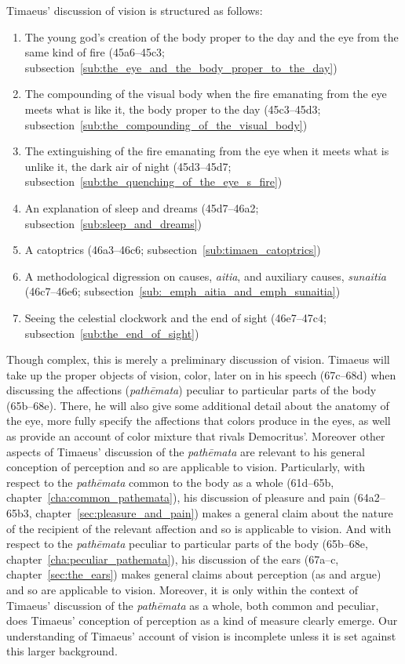 Timaeus' discussion of vision is structured as follows:
\begin{enumerate}
	\item The young god's creation of the body proper to the day and the eye from the same kind of fire (45a6--45c3; subsection~\ref{sub:the_eye_and_the_body_proper_to_the_day})
	\item The compounding of the visual body when the fire emanating from the eye meets what is like it, the body proper to the day (45c3--45d3; subsection~\ref{sub:the_compounding_of_the_visual_body})
	\item The extinguishing of the fire emanating from the eye when it meets what is unlike it, the dark air of night (45d3--45d7; subsection~\ref{sub:the_quenching_of_the_eye_s_fire})
	\item An explanation of sleep and dreams (45d7--46a2; subsection~\ref{sub:sleep_and_dreams})
	\item A catoptrics (46a3--46c6; subsection~\ref{sub:timaen_catoptrics})
	\item A methodological digression on causes, \emph{aitia}, and auxiliary causes, \emph{sunaitia} (46c7--46e6; subsection~\ref{sub:_emph_aitia_and_emph_sunaitia})
	\item Seeing the celestial clockwork and the end of sight (46e7--47c4; subsection~\ref{sub:the_end_of_sight})
\end{enumerate}
Though complex, this is merely a preliminary discussion of vision. Timaeus will take up the proper objects of vision, color, later on in his speech (67c–68d) when discussing the affections (\emph{pathēmata}) peculiar to particular parts of the body (65b–68e). There, he will also give some additional detail about the anatomy of the eye, more fully specify the affections that colors produce in the eyes, as well as provide an account of color mixture that rivals Democritus'. Moreover other aspects of Timaeus' discussion of the \emph{pathēmata} are relevant to his general conception of perception and so are applicable to vision. Particularly, with respect to the \emph{pathēmata} common to the body as a whole (61d–65b, chapter~\ref{cha:common_pathemata}), his discussion of pleasure and pain (64a2–65b3, chapter~\ref{sec:pleasure_and_pain}) makes a general claim about the nature of the recipient of the relevant affection and so is applicable to vision. And with respect to the \emph{pathēmata} peculiar to particular parts of the body (65b–68e, chapter~\ref{cha:peculiar_pathemata}), his discussion of the ears (67a–c, chapter~\ref{sec:the_ears}) makes general claims about perception (as \citealt{Barker:2000dy} and \citealt{Lautner:2005aa} argue) and so are applicable to vision. Moreover, it is only within the context of Timaeus' discussion of the \emph{pathēmata} as a whole, both common and peculiar, does Timaeus' conception of perception as a kind of measure clearly emerge. Our understanding of Timaeus' account of vision is incomplete unless it is set against this larger background.

